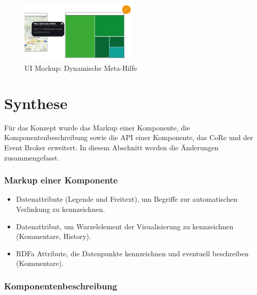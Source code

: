 \documentclass[
	headsepline,
	footsepline,
	fontsize=12pt,
	bibliography=totoc
]{scrbook}
\begin{document}
\begin{figure}[htbp]
   \centering
   \includegraphics[width=0.5\textwidth]{images/konzeption-meta-dyn.png}
   \caption{UI Mockup: Dynamische Meta-Hilfe}
   \label{figure:meta-dyn}
\end{figure}

\section{Synthese}
\label{section:konzeption:synthese}

Für das Konzept wurde das Markup einer Komponente, die Komponentenbeschreibung sowie die API einer Komponente, das CoRe und der Event Broker erweitert. In diesem Abschnitt werden die Änderungen zusammengefasst.

\subsubsection{Markup einer Komponente}

\begin{itemize}
	\item Datenattribute (Legende und Freitext), um Begriffe zur automatischen Verlinkung zu kennzeichnen.
	\item Datenattribut, um Wurzelelement der Visualisierung zu kennzeichnen (Kommentare, History).
	\item RDFa Attribute, die Datenpunkte kennzeichnen und eventuell beschreiben (Kommentare).
\end{itemize}

\subsubsection{Komponentenbeschreibung}
\end{document}
